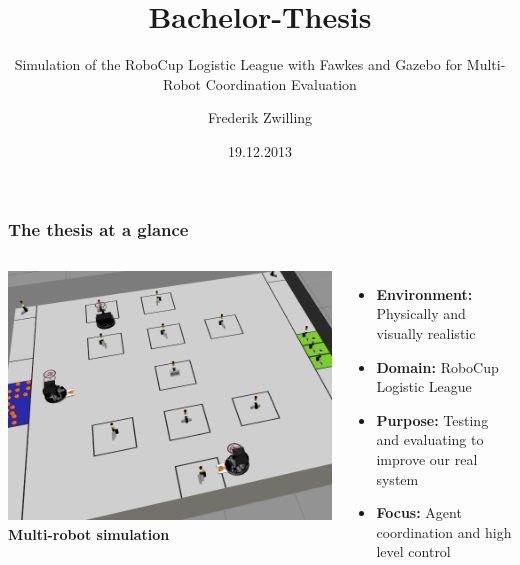 \documentclass[]{beamer}
\title{Bachelor-Thesis}
\subtitle{Simulation of the RoboCup Logistic League with Fawkes and Gazebo for Multi-Robot Coordination Evaluation}
\author {Frederik Zwilling}
\institute{RWTH Aachen}
\date{19.12.2013}
\begin{document}
\frame{\titlepage}

\begin{frame}
  \frametitle{The thesis at a glance}
  \begin{columns}
  \includegraphics[width=\textwidth]{../pics/sim_working_small.png}
  \textbf{\large Multi-robot simulation}
    \begin{itemize}
    \item \textbf{Environment:} Physically and visually realistic
    \item \textbf{Domain:} RoboCup Logistic League
    \item \textbf{Purpose:} Testing and evaluating to improve our real system
    \item \textbf{Focus:} Agent coordination and high level control
    \end{itemize}
  \end{columns}
\end{frame}

\end{document}

